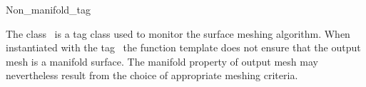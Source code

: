 

\begin{ccRefClass}{Non_manifold_tag}  %


\ccDefinition
  
The class \ccRefName\ is a tag class used to monitor the
surface meshing algorithm. When instantiated with the tag
\ccRefName\, the function template 
does not ensure that the output mesh  is a  manifold surface.
The manifold property of output mesh
 may nevertheless result from the choice of
appropriate meshing criteria.











\ccSeeAlso

\\
 \\
 \\




\end{ccRefClass}


